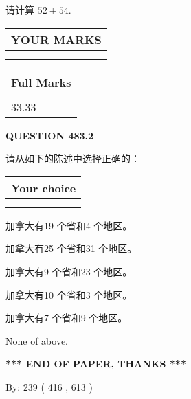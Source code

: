 \documentclass{ctexart}
\begin{document}
  
 
请计算 $ %
52 +  %
54 $.
 

 

 
  
\vspace{0.2in}
  
\noindent\begin{tabular}{|l|}
\hline
 YOUR MARKS  \\
\hline
 \\ 
 \\ 
\hline
\end{tabular}
\hspace{0.05in} \begin{tabular}{|l|}
\hline
 Full Marks  \\
\hline
 \\ 
33.33 \\
\hline
\end{tabular}
{\textbf{\Large{QUESTION
483.2 
}}}
  
  
请从如下的陈述中选择正确的：
  
  
\noindent\hspace{3.0in} \begin{tabular}{|l|}
\hline
Your choice \\
\hline
 \\ 
 \\ 
\hline
\end{tabular}
  
  
 
 
加拿大有19 个省和4 个地区。
 
 
加拿大有25 个省和31 个地区。
 
 
加拿大有9 个省和23 个地区。
 
 
加拿大有10 个省和3 个地区。
 
 
加拿大有7 个省和9 个地区。
 
 
 None of above.
 
 
   
   
 \vspace{0.2in}
 
   
   
   
   
\vspace{1.0in} 
{\textbf{\large{ *** END OF PAPER, THANKS *** }}} 
   
   
\hspace{1.0in} By: 
 239 ( 416 ,  613 )
   
\end{document}
